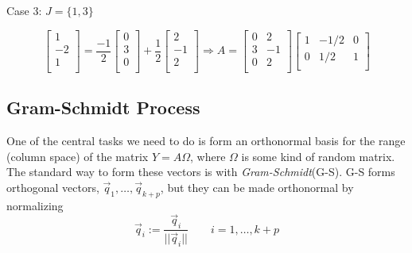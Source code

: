 Case 3: $J=\{1,3\}$

\begin{equation*}
    \begin{bmatrix}
        1\\
        -2\\
        1\\
    \end{bmatrix}
    =
    \frac{-1}{2}
    \begin{bmatrix}
        0\\
        3\\
        0\\
    \end{bmatrix}
    +
    \frac{1}{2}
    \begin{bmatrix}
        2\\
        -1\\
        2\\
    \end{bmatrix}
    \Rightarrow
    A =
    \begin{bmatrix}
        0&2\\
        3&-1\\
        0&2\\
    \end{bmatrix}
    \begin{bmatrix}
        1&-1/2&0\\
        0&1/2&1\\
    \end{bmatrix}
\end{equation*}


\subsection{Gram-Schmidt Process}

One of the central tasks we need to do is form an orthonormal basis for the range (column space) of
the matrix $Y=A\Omega$, where $\Omega$ is some kind of random matrix. The standard way to form these
vectors is with \emph{Gram-Schmidt}(G-S).  G-S forms orthogonal vectors, $\vec{q}_1, \ldots, \vec{q}_{k+p}$, but they can be made orthonormal by normalizing
\begin{equation*}
    \vec{q}_i := \frac{\vec{q}_i}{||\vec{q}_i||} \qquad i=1, \ldots, k+p
\end{equation*}


